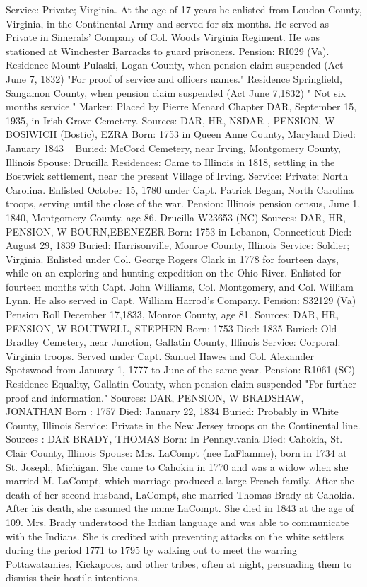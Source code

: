 Service: Private; Virginia. At the age of 17 years he enlisted from Loudon County, Virginia, in the Continental Army and served for six months. He served as Private in Simerals' Company of Col. Woods Virginia Regiment. He was stationed at Winchester Barracks to guard prisoners. 
Pension: RI029 (Va). 
Residence Mount Pulaski, Logan County, when pension claim suspended (Act June 7, 1832) "For proof of service and officers names." 
Residence Springfield, Sangamon County, when pension claim suspended (Act June 7,1832) " Not six months service." 
Marker: Placed by Pierre Menard Chapter DAR, September 15, 1935, in Irish Grove Cemetery. 
Sources: DAR, HR, NSDAR , PENSION, W 
BOSlWICH (Bostic), EZRA 
Born: 1753 in Queen Anne County, Maryland 
Died: January 1843 ~ 
Buried: McCord Cemetery, near Irving, Montgomery County, Illinois 
Spouse: Drucilla 
Residences: Came to Illinois in 1818, settling in the Bostwick settlement, near the present Village of Irving. 
Service: Private; North Carolina. Enlisted October 15, 1780 under Capt. Patrick Began, North Carolina troops, serving until the close of the war. 
Pension: Illinois pension census, June 1, 1840, Montgomery County. age 86. Drucilla W23653 (NC) 
Sources: DAR, HR, PENSION, W 
BOURN,EBENEZER 
Born: 1753 in Lebanon, Connecticut 
Died: August 29, 1839 
Buried: Harrisonville, Monroe County, Illinois 
Service: Soldier; Virginia. Enlisted under Col. George Rogers Clark in 1778 for fourteen days, while on an exploring and hunting expedition on the Ohio River. Enlisted for fourteen months with Capt. John Williams, Col. Mont­gomery, and Col. William Lynn. He also served in Capt. William Harrod's Company. 
Pension: S32129 (Va) Pension Roll December 17,1833, Monroe County, age 81. 
Sources: DAR, HR, PENSION, W 
BOUTWELL, STEPHEN 
Born: 1753 
Died: 1835 
Buried: Old Bradley Cemetery, near Junction, Gallatin County, Illinois 
Service: Corporal: Virginia troops. Served under Capt. Samuel Hawes and Col. Alexander Spotswood from January 1, 1777 to June of the same year. 
Pension: R1061 (SC) Residence Equality, Gallatin County, when pension claim suspended "For further proof and information." 
Sources: DAR, PENSION, W 
BRADSHAW, JONATHAN 
Born : 1757 
Died: January 22, 1834 
Buried: Probably in White County, Illinois 
Service: Private in the New Jersey troops on the Continental line. Sources : DAR 
BRADY, THOMAS 
Born: In Pennsylvania 
Died: Cahokia, St. Clair County, Illinois Spouse: Mrs. LaCompt (nee LaFlamme), born in 1734 at St. Joseph, Michigan. She came to Cahokia in 1770 and was a widow when she married M. La­Compt, which marriage produced a large French family. After the death of her second husband, LaCompt, she married Thomas Brady at Cahokia. After his death, she assumed the name LaCompt. She died in 1843 at the age of 109. Mrs. Brady understood the Indian language and was able to communi­cate with the Indians. She is credited with preventing attacks on the white settlers during the period 1771 to 1795 by walking out to meet the warring Pottawatamies, Kickapoos, and other tribes, often at night, persuading them to dismiss their hostile intentions. 
